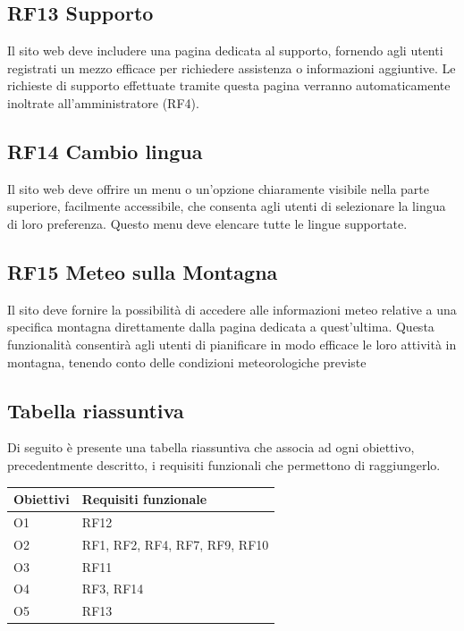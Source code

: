 \documentclass[a4paper,12pt]{article}
\begin{document}
\subsection*{RF13 Supporto}
Il sito web deve includere una pagina dedicata al supporto, fornendo agli utenti registrati un mezzo efficace per richiedere assistenza o informazioni aggiuntive. Le richieste di supporto effettuate tramite questa pagina verranno automaticamente inoltrate all'amministratore (RF4).

\subsection*{RF14 Cambio lingua}
Il sito web deve offrire un menu o un'opzione chiaramente visibile nella parte superiore, facilmente accessibile, che consenta agli utenti di selezionare la lingua di loro preferenza. Questo menu deve elencare tutte le lingue supportate.


\subsection*{RF15 Meteo sulla Montagna}
Il sito deve fornire la possibilità di accedere alle informazioni meteo relative a una specifica montagna direttamente dalla pagina dedicata a quest'ultima. Questa funzionalità consentirà agli utenti di pianificare in modo efficace le loro attività in montagna, tenendo conto delle condizioni meteorologiche previste





\newpage
\subsection*{Tabella riassuntiva}

Di seguito è presente una tabella riassuntiva che associa ad ogni obiettivo, precedentmente descritto, i requisiti funzionali che permettono di raggiungerlo.

\begin{center}
    

\begin{tabular}{|l|l|}
\hline
Obiettivi     &Requisiti funzionale          \\
\hline
O1            & RF12\\ \hline 
O2            & RF1, RF2, RF4, RF7, RF9, RF10\\ \hline 
O3            & RF11\\ \hline 
O4            & RF3, RF14\\\hline
 O5&RF13\\\hline 
\end{tabular}
\newpage
\end{center}
\end{document}
